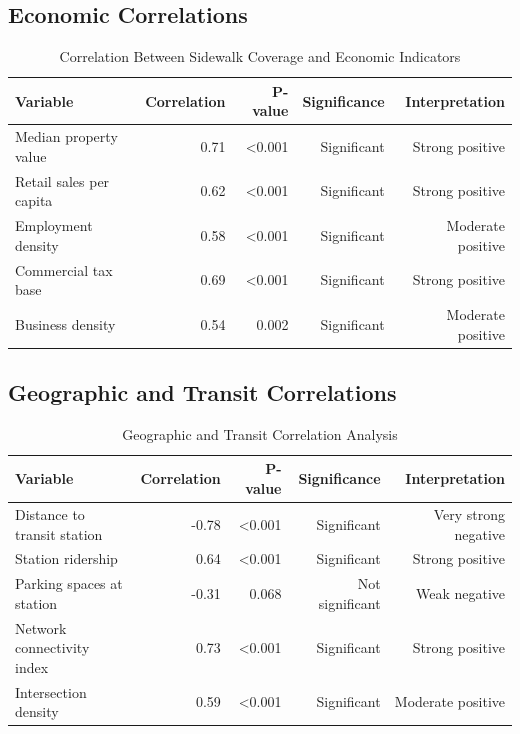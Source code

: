 \documentclass[11pt,letterpaper]{article}
\begin{document}
\subsection{Economic Correlations}

\begin{table}[h]
\centering
\caption{Correlation Between Sidewalk Coverage and Economic Indicators}
\begin{tabular}{lrrrr}
\toprule
\textbf{Variable} & \textbf{Correlation} & \textbf{P-value} & \textbf{Significance} & \textbf{Interpretation} \\
\midrule
Median property value & 0.71 & <0.001 & Significant & Strong positive \\
Retail sales per capita & 0.62 & <0.001 & Significant & Strong positive \\
Employment density & 0.58 & <0.001 & Significant & Moderate positive \\
Commercial tax base & 0.69 & <0.001 & Significant & Strong positive \\
Business density & 0.54 & 0.002 & Significant & Moderate positive \\
\bottomrule
\end{tabular}
\end{table}

\subsection{Geographic and Transit Correlations}

\begin{table}[h]
\centering
\caption{Geographic and Transit Correlation Analysis}
\begin{tabular}{lrrrr}
\toprule
\textbf{Variable} & \textbf{Correlation} & \textbf{P-value} & \textbf{Significance} & \textbf{Interpretation} \\
\midrule
Distance to transit station & -0.78 & <0.001 & Significant & Very strong negative \\
Station ridership & 0.64 & <0.001 & Significant & Strong positive \\
Parking spaces at station & -0.31 & 0.068 & Not significant & Weak negative \\
Network connectivity index & 0.73 & <0.001 & Significant & Strong positive \\
Intersection density & 0.59 & <0.001 & Significant & Moderate positive \\
\bottomrule
\end{tabular}
\end{table}
\end{document}
